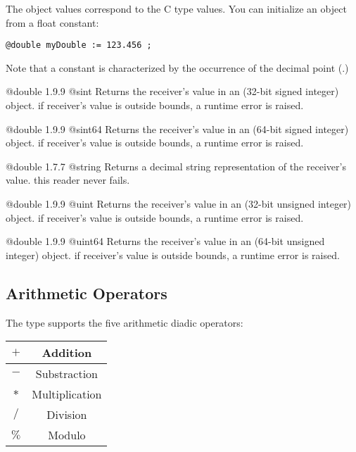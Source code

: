 
The  object values correspond to the C type  values. You can initialize an  object from a float constant:

\texttt{@double myDouble := 123.456 ;}

Note that a  constant is characterized by the occurrence of the decimal point (.)


{@double}
{1.9.9}
{@sint}
{Returns the receiver's value in an  (32-bit signed integer) object.}
{if receiver's value is outside  bounds, a runtime error is raised.}



{@double}
{1.9.9}
{@sint64}
{Returns the receiver's value in an  (64-bit signed integer) object.}
{if receiver's value is outside  bounds, a runtime error is raised.}




{@double}
{1.7.7}
{@string}
{Returns a decimal string representation of the receiver's value.}
{this reader never fails.}







{@double}
{1.9.9}
{@uint}
{Returns the receiver's value in an  (32-bit unsigned integer) object.}
{if receiver's value is outside  bounds, a runtime error is raised.}





{@double}
{1.9.9}
{@uint64}
{Returns the receiver's value in an  (64-bit unsigned integer) object.}
{if receiver's value is outside  bounds, a runtime error is raised.}




\subsection{Arithmetic Operators}

The  type supports the five arithmetic diadic operators:\newline

\begin{tabular}{|c|c|}
\hline
$+$ & Addition \\
\hline
$-$ & Substraction \\
\hline
$*$ & Multiplication \\
\hline
$/$ & Division \\
\hline
$\%$ & Modulo \\
\hline
\end{tabular}\newline


